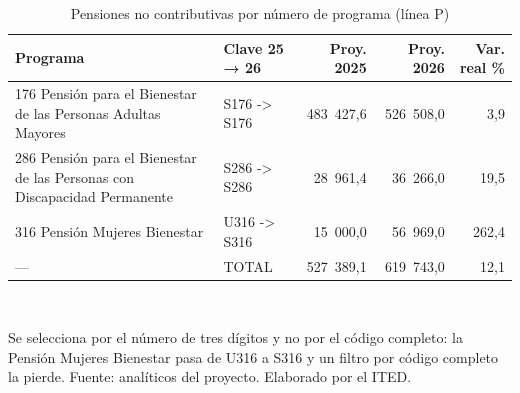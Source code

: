 \begin{table}[htbp]
\centering
\scriptsize
\caption{Pensiones no contributivas por número de programa (línea P)}
\label{cua:C7_1}
\begin{tabular}{p{5.8cm}p{2.2cm}rrr}
\toprule
\textbf{Programa} & \textbf{Clave 25 → 26} & \textbf{Proy. 2025} & \textbf{Proy. 2026} & \textbf{Var. real \%} \\
\midrule
176 Pensión para el Bienestar de las Personas Adultas Mayores & S176 -> S176 & 483 427,6 & 526 508,0 & 3,9 \\
286 Pensión para el Bienestar de las Personas con Discapacidad Permanente & S286 -> S286 & 28 961,4 & 36 266,0 & 19,5 \\
316 Pensión Mujeres Bienestar & U316 -> S316 & 15 000,0 & 56 969,0 & 262,4 \\
--- & TOTAL & 527 389,1 & 619 743,0 & 12,1 \\
\bottomrule
\end{tabular}
\\[2pt]\begin{minipage}{0.92\textwidth}\scriptsize Se selecciona por el número de tres dígitos y no por el código completo: la Pensión Mujeres Bienestar pasa de U316 a S316 y un filtro por código completo la pierde. Fuente: analíticos del proyecto. Elaborado por el ITED.\end{minipage}
\end{table}
